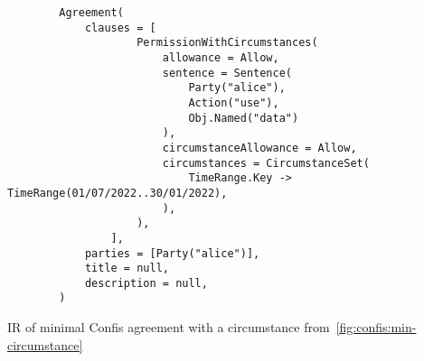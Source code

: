 \begin{code}
    \begin{verbatim}
        Agreement(
            clauses = [
                    PermissionWithCircumstances(
                        allowance = Allow,
                        sentence = Sentence(
                            Party("alice"),
                            Action("use"),
                            Obj.Named("data")
                        ),
                        circumstanceAllowance = Allow,
                        circumstances = CircumstanceSet(
                            TimeRange.Key -> TimeRange(01/07/2022..30/01/2022),
                        ),
                    ),
                ],
            parties = [Party("alice")],
            title = null,
            description = null,
        )
\end{verbatim}
    \caption{IR of minimal Confis agreement with a circumstance from~\autoref{fig:confis:min-circumstance}}
    \label{fig:confis:min-circumstance-ir}
\end{code}

